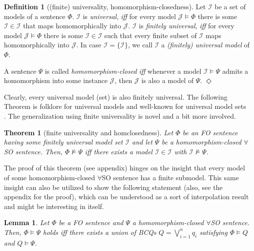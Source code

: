 \documentclass[10pt,a4paper]{amsart}
\theoremstyle{definition}
\numberwithin{equation}{section}
\theoremstyle{plain}
\newtheorem{theorem}[theorem]{Theorem}
\newtheorem{lemma}[lemma]{Lemma}
\theoremstyle{definition}
\newtheorem{definition}[definition]{Definition}
\theoremstyle{myexample}
\theoremstyle{plain}
\theoremstyle{definition}
\newcommand{\instance}{\mathcal{I}}
\newcommand{\iffi}{\textit{iff} } %
\newcommand{\defend}{\hfill\ensuremath{\Diamond}}
\begin{document}
\begin{definition}[(finite) universality, homomor\-phism-closedness]
Let $\mathscr{I}$ be a set of models of a sentence $\Phi$.
$\mathscr{I}$ is \emph{universal}, \iffi for every model $\mathcal{J} \models \Phi$ there is some $\instance \in \mathscr{I}$ that maps homomorphically into $\mathcal{J}$.
$\mathscr{I}$ is \emph{finitely universal}, \iffi for every model $\mathcal{J} \models \Phi$ there is some $\instance \in \mathscr{I}$ such that every finite subset of $\instance$ maps homomorphically into $\mathcal{J}$.  
%
In case $\mathscr{I} = \{\instance\}$, we call $\instance$ a \emph{(finitely) universal model} of $\Phi$.


A sentence $\Psi$ is called \emph{homomorphism-closed} \iffi whenever a model $\instance \models \Psi$ admits a homomorphism into some instance $\mathcal{J}$, then $\mathcal{J}$ is also a model of $\Psi$. \defend
\end{definition}
%
Clearly, every universal model (set) is also finitely universal.
The following Theorem is folklore for universal models and well-known for universal model sets \cite{BourhisMMP16}.
The generalization using finite universality is novel and a bit more involved.
%

\begin{theorem}[finite universality and homclosedness]\label{thm:universal}
Let $\Phi$ be an FO sentence having some finitely universal model set $\mathscr{I}$ and let $\Psi$ be a homomorphism-closed $\forall$SO sentence. Then, $\Phi \not \models \Psi$ \iffi there exists a model $\instance \in \mathscr{I}$ with $\instance \not\models \Psi$.
\end{theorem}

%
The proof of this theorem (see appendix) hinges on the insight that every model of some homomorphism-closed $\forall$SO sentence has a fi\-nite submodel.
This same insight can also be utilized to show the following statement (also, see the appendix for the proof), which can be understood as a sort of interpolation result and might be interesting in itself.
%
\begin{lemma}\label{lem:interpolation}
Let $\Phi$ be a FO sentence and $\Psi$ a homomorphism-closed $\forall$SO sentence.
Then, $\Phi \models \Psi$ holds \iffi there exists a union of BCQs $Q = \bigvee_{i=1}^n q_{i}$ satisfying $\Phi \models Q$ and $Q \models \Psi$.
\end{lemma}
\end{document}
